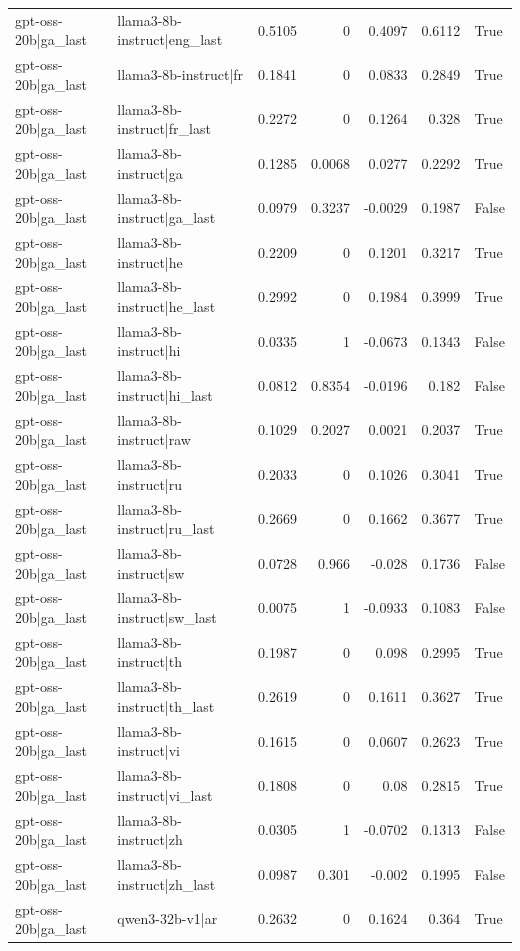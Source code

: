 \begin{table}
\begin{tabular}{l l r r r r l}
gpt-oss-20b|ga_last & llama3-8b-instruct|eng_last & 0.5105 & 0 & 0.4097 & 0.6112 & True \\
gpt-oss-20b|ga_last & llama3-8b-instruct|fr & 0.1841 & 0 & 0.0833 & 0.2849 & True \\
gpt-oss-20b|ga_last & llama3-8b-instruct|fr_last & 0.2272 & 0 & 0.1264 & 0.328 & True \\
gpt-oss-20b|ga_last & llama3-8b-instruct|ga & 0.1285 & 0.0068 & 0.0277 & 0.2292 & True \\
gpt-oss-20b|ga_last & llama3-8b-instruct|ga_last & 0.0979 & 0.3237 & -0.0029 & 0.1987 & False \\
gpt-oss-20b|ga_last & llama3-8b-instruct|he & 0.2209 & 0 & 0.1201 & 0.3217 & True \\
gpt-oss-20b|ga_last & llama3-8b-instruct|he_last & 0.2992 & 0 & 0.1984 & 0.3999 & True \\
gpt-oss-20b|ga_last & llama3-8b-instruct|hi & 0.0335 & 1 & -0.0673 & 0.1343 & False \\
gpt-oss-20b|ga_last & llama3-8b-instruct|hi_last & 0.0812 & 0.8354 & -0.0196 & 0.182 & False \\
gpt-oss-20b|ga_last & llama3-8b-instruct|raw & 0.1029 & 0.2027 & 0.0021 & 0.2037 & True \\
gpt-oss-20b|ga_last & llama3-8b-instruct|ru & 0.2033 & 0 & 0.1026 & 0.3041 & True \\
gpt-oss-20b|ga_last & llama3-8b-instruct|ru_last & 0.2669 & 0 & 0.1662 & 0.3677 & True \\
gpt-oss-20b|ga_last & llama3-8b-instruct|sw & 0.0728 & 0.966 & -0.028 & 0.1736 & False \\
gpt-oss-20b|ga_last & llama3-8b-instruct|sw_last & 0.0075 & 1 & -0.0933 & 0.1083 & False \\
gpt-oss-20b|ga_last & llama3-8b-instruct|th & 0.1987 & 0 & 0.098 & 0.2995 & True \\
gpt-oss-20b|ga_last & llama3-8b-instruct|th_last & 0.2619 & 0 & 0.1611 & 0.3627 & True \\
gpt-oss-20b|ga_last & llama3-8b-instruct|vi & 0.1615 & 0 & 0.0607 & 0.2623 & True \\
gpt-oss-20b|ga_last & llama3-8b-instruct|vi_last & 0.1808 & 0 & 0.08 & 0.2815 & True \\
gpt-oss-20b|ga_last & llama3-8b-instruct|zh & 0.0305 & 1 & -0.0702 & 0.1313 & False \\
gpt-oss-20b|ga_last & llama3-8b-instruct|zh_last & 0.0987 & 0.301 & -0.002 & 0.1995 & False \\
gpt-oss-20b|ga_last & qwen3-32b-v1|ar & 0.2632 & 0 & 0.1624 & 0.364 & True \\

\end{tabular}
\end{table}
